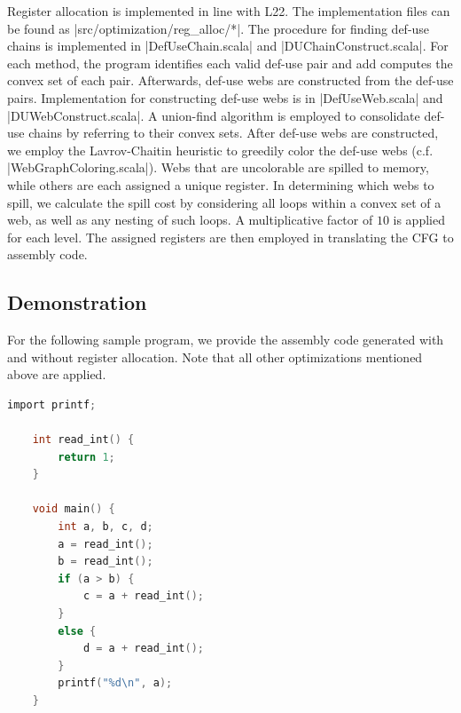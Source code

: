 Register allocation is implemented in line with L22. The implementation files can be found as |src/optimization/reg_alloc/*|. The procedure for finding def-use chains is implemented in |DefUseChain.scala| and |DUChainConstruct.scala|. For each method, the program identifies each valid def-use pair and add computes the convex set of each pair. Afterwards, def-use webs are constructed from the def-use pairs. Implementation for constructing def-use webs is in |DefUseWeb.scala| and |DUWebConstruct.scala|. A union-find algorithm is employed to consolidate def-use chains by referring to their convex sets. After def-use webs are constructed, we employ the Lavrov-Chaitin heuristic to greedily color the def-use webs (c.f. |WebGraphColoring.scala|). Webs that are uncolorable are spilled to memory, while others are each assigned a unique register. In determining which webs to spill, we calculate the spill cost by considering all loops within a convex set of a web, as well as any nesting of such loops. A multiplicative factor of $10$ is applied for each level. The assigned registers are then employed in translating the CFG to assembly code.

\subsection{Demonstration}

For the following sample program, we provide the assembly code generated with and without register allocation. Note that all other optimizations mentioned above are applied.

\begin{lstlisting}[language=C]
    import printf;

    int read_int() {
        return 1;
    }

    void main() {
        int a, b, c, d;
        a = read_int();
        b = read_int();
        if (a > b) {
            c = a + read_int();
        }
        else {
            d = a + read_int();
        }
        printf("%d\n", a);
    }
\end{lstlisting}

